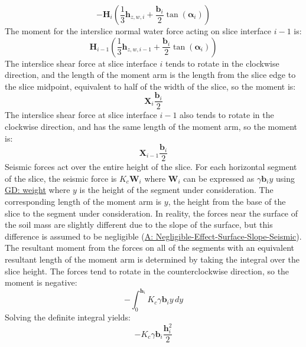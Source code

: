 \documentclass[12pt]{article}
\begin{document}
\begin{displaymath}
-{\mathbf{H}}_{i} \left(\frac{1}{3} {\mathbf{h}_{z,w,i}}+\frac{{\mathbf{b}}_{i}}{2} \tan\left({\mathbf{α}}_{i}\right)\right)
\end{displaymath}
The moment for the interslice normal water force acting on slice interface $i-1$ is:
\begin{displaymath}
{\mathbf{H}}_{i-1} \left(\frac{1}{3} {\mathbf{h}_{z,w,i-1}}+\frac{{\mathbf{b}}_{i}}{2} \tan\left({\mathbf{α}}_{i}\right)\right)
\end{displaymath}
The interslice shear force at slice interface $i$ tends to rotate in the clockwise direction, and the length of the moment arm is the length from the slice edge to the slice midpoint, equivalent to half of the width of the slice, so the moment is:
\begin{displaymath}
{\mathbf{X}}_{i} \frac{{\mathbf{b}}_{i}}{2}
\end{displaymath}
The interslice shear force at slice interface $i-1$ also tends to rotate in the clockwise direction, and has the same length of the moment arm, so the moment is:
\begin{displaymath}
{\mathbf{X}}_{i-1} \frac{{\mathbf{b}}_{i}}{2}
\end{displaymath}
Seismic forces act over the entire height of the slice. For each horizontal segment of the slice, the seismic force is ${K_{c}} {\mathbf{W}}_{i}$ where ${\mathbf{W}}_{i}$ can be expressed as $γ {\mathbf{b}}_{i} y$ using \hyperref[GD:weight]{GD: weight} where $y$ is the height of the segment under consideration. The corresponding length of the moment arm is $y$, the height from the base of the slice to the segment under consideration. In reality, the forces near the surface of the soil mass are slightly different due to the slope of the surface, but this difference is assumed to be negligible (\hyperref[assumpNESSS]{A: Negligible-Effect-Surface-Slope-Seismic}). The resultant moment from the forces on all of the segments with an equivalent resultant length of the moment arm is determined by taking the integral over the slice height. The forces tend to rotate in the counterclockwise direction, so the moment is negative:
\begin{displaymath}
-\int_{0}^{{\mathbf{h}}_{i}}{{K_{c}} γ {\mathbf{b}}_{i} y}\,dy
\end{displaymath}
Solving the definite integral yields:
\begin{displaymath}
-{K_{c}} γ {\mathbf{b}}_{i} \frac{{\mathbf{h}}_{i}^{2}}{2}
\end{displaymath}
\end{document}

